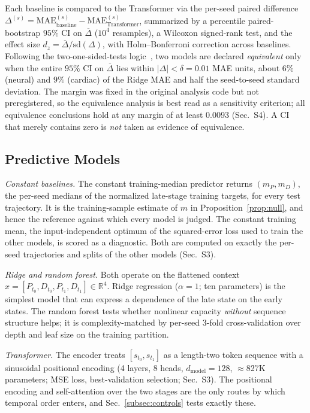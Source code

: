 \documentclass[10pt,journal,compsoc]{IEEEtran}
\begin{document}
Each baseline is compared to the Transformer via the per-seed paired difference $\Delta^{(s)} = \mathrm{MAE}^{(s)}_{\text{baseline}} - \mathrm{MAE}^{(s)}_{\text{Transformer}}$, summarized by a percentile paired-bootstrap $95\%$ CI on $\overline{\Delta}$ ($10^4$ resamples), a Wilcoxon signed-rank test, and the effect size $d_z=\overline{\Delta}/\mathrm{sd}(\Delta)$, with Holm--Bonferroni correction across baselines. Following the two-one-sided-tests logic~\cite{lakens2017equivalence}, two models are declared \emph{equivalent} only when the entire $95\%$ CI on $\overline{\Delta}$ lies within $|\Delta|<\delta=0.01$ MAE units, about $6\%$ (neural) and $9\%$ (cardiac) of the Ridge MAE and half the seed-to-seed standard deviation. The margin was fixed in the original analysis code but not preregistered, so the equivalence analysis is best read as a sensitivity criterion; all equivalence conclusions hold at any margin of at least $0.0093$ (Sec.~S4). A CI that merely contains zero is \emph{not} taken as evidence of equivalence.

\subsection{Predictive Models}
\label{subsec:models}

\emph{Constant baselines.} The constant training-median predictor returns $(m_P,m_D)$, the per-seed medians of the normalized late-stage training targets, for every test trajectory. It is the training-sample estimate of $m$ in Proposition~\ref{prop:null}, and hence the reference against which every model is judged. The constant training mean, the input-independent optimum of the squared-error loss used to train the other models, is scored as a diagnostic. Both are computed on exactly the per-seed trajectories and splits of the other models (Sec.~S3).

\emph{Ridge and random forest.} Both operate on the flattened context $x=[P_{t_0},D_{t_0},P_{t_1},D_{t_1}]\in\mathbb{R}^4$. Ridge regression ($\alpha=1$; ten parameters) is the simplest model that can express a dependence of the late state on the early states. The random forest tests whether nonlinear capacity \emph{without} sequence structure helps; it is complexity-matched by per-seed 3-fold cross-validation over depth and leaf size on the training partition.

\emph{Transformer.} The encoder treats $[s_{t_0},s_{t_1}]$ as a length-two token sequence with a sinusoidal positional encoding (4 layers, 8 heads, $d_{\mathrm{model}}=128$, $\approx$827K parameters; MSE loss, best-validation selection; Sec.~S3). The positional encoding and self-attention over the two stages are the only routes by which temporal order enters, and Sec.~\ref{subsec:controls} tests exactly these.
\end{document}
